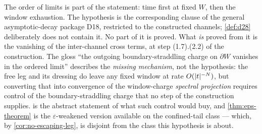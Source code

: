 \begin{scope}
\label{scope:ad3-ex}
The order of limits is part of the statement: time first at fixed $W$, then the
window exhaustion. The hypothesis is the corresponding clause of the general
asymptotic-decay package D18, restricted to the constructed channels;
\cref{def:d28} deliberately does not contain it. No part of it is proved. What
\emph{is} proved from it is the vanishing of the inter-channel cross terms, at
step (1.7).(2.2) of the construction. The gloss ``the outgoing
boundary-straddling charge on $\partial W$ vanishes in the ordered limit''
describes the \emph{missing mechanism}, not the hypothesis: the free leg and
its dressing do leave any fixed window at rate $O(\lvert t\rvert^{-N})$, but
converting that into convergence of the window-charge \emph{spectral
projection} requires control of the boundary-straddling charge that no step of
the construction supplies.  is the abstract
statement of what such control would buy, and \cref{thm:eps-theorem} is the
$\varepsilon$-weakened version available on the confined-tail class --- which,
by \cref{cor:no-escaping-leg}, is disjoint from the class this hypothesis is
about.
\end{scope}

